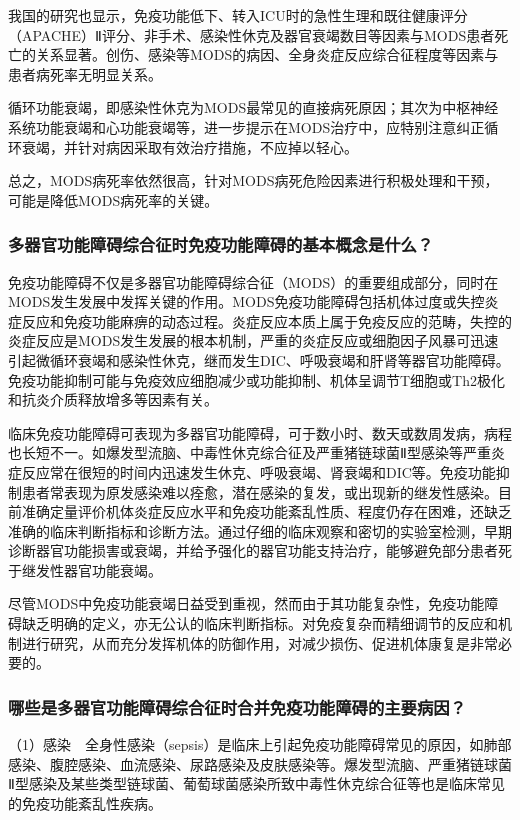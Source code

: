 我国的研究也显示，免疫功能低下、转入ICU时的急性生理和既往健康评分（APACHE）Ⅱ评分、非手术、感染性休克及器官衰竭数目等因素与MODS患者死亡的关系显著。创伤、感染等MODS的病因、全身炎症反应综合征程度等因素与患者病死率无明显关系。

循环功能衰竭，即感染性休克为MODS最常见的直接病死原因；其次为中枢神经系统功能衰竭和心功能衰竭等，进一步提示在MODS治疗中，应特别注意纠正循环衰竭，并针对病因采取有效治疗措施，不应掉以轻心。

总之，MODS病死率依然很高，针对MODS病死危险因素进行积极处理和干预，可能是降低MODS病死率的关键。

\subsubsection{多器官功能障碍综合征时免疫功能障碍的基本概念是什么？}

免疫功能障碍不仅是多器官功能障碍综合征（MODS）的重要组成部分，同时在MODS发生发展中发挥关键的作用。MODS免疫功能障碍包括机体过度或失控炎症反应和免疫功能麻痹的动态过程。炎症反应本质上属于免疫反应的范畴，失控的炎症反应是MODS发生发展的根本机制，严重的炎症反应或细胞因子风暴可迅速引起微循环衰竭和感染性休克，继而发生DIC、呼吸衰竭和肝肾等器官功能障碍。免疫功能抑制可能与免疫效应细胞减少或功能抑制、机体呈调节T细胞或Th2极化和抗炎介质释放增多等因素有关。

临床免疫功能障碍可表现为多器官功能障碍，可于数小时、数天或数周发病，病程也长短不一。如爆发型流脑、中毒性休克综合征及严重猪链球菌Ⅱ型感染等严重炎症反应常在很短的时间内迅速发生休克、呼吸衰竭、肾衰竭和DIC等。免疫功能抑制患者常表现为原发感染难以痊愈，潜在感染的复发，或出现新的继发性感染。目前准确定量评价机体炎症反应水平和免疫功能紊乱性质、程度仍存在困难，还缺乏准确的临床判断指标和诊断方法。通过仔细的临床观察和密切的实验室检测，早期诊断器官功能损害或衰竭，并给予强化的器官功能支持治疗，能够避免部分患者死于继发性器官功能衰竭。

尽管MODS中免疫功能衰竭日益受到重视，然而由于其功能复杂性，免疫功能障碍缺乏明确的定义，亦无公认的临床判断指标。对免疫复杂而精细调节的反应和机制进行研究，从而充分发挥机体的防御作用，对减少损伤、促进机体康复是非常必要的。

\subsubsection{哪些是多器官功能障碍综合征时合并免疫功能障碍的主要病因？}

（1）感染　全身性感染（sepsis）是临床上引起免疫功能障碍常见的原因，如肺部感染、腹腔感染、血流感染、尿路感染及皮肤感染等。爆发型流脑、严重猪链球菌Ⅱ型感染及某些类型链球菌、葡萄球菌感染所致中毒性休克综合征等也是临床常见的免疫功能紊乱性疾病。


